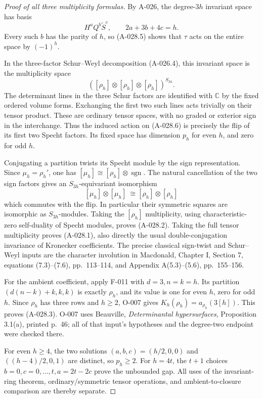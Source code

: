 \begin{proof}[Proof of all three multiplicity formulas]
By A-026, the degree-\(3h\) invariant space has basis
\[
                    H^a Q^b\widetilde S^c,
                    \qquad 2a+3b+4c=h.
\]
Every such \(b\) has the parity of \(h\), so (A-028.5) shows
that \(\tau\) acts on the entire space by \((-1)^h\).

In the three-factor Schur--Weyl decomposition (A-026.4), this
invariant space is the multiplicity space
\[
                  ([\rho_h]\otimes[\rho_h]\otimes[\rho_h])^{S_{3h}}.
                                                               \tag{A-028.6}
\]
The determinant lines in the three Schur factors are identified with
\(\mathbb C\) by the fixed ordered volume forms. Exchanging the
first two such lines acts trivially on their tensor product. These
are ordinary tensor spaces, with no graded or exterior sign in the
interchange. Thus the induced action on (A-028.6) is precisely the
flip of its first two Specht factors. Its fixed space has dimension
\(p_h\) for even \(h\), and zero for odd \(h\).

Conjugating a partition twists its Specht module by the sign
representation. Since \(\mu_h=\rho_h'\), one has
\([\mu_h]\cong[\rho_h]\otimes\operatorname{sgn}\).
The natural cancellation of the two sign factors gives an
\(S_{3h}\)-equivariant isomorphism
\[
 [\mu_h]\otimes[\mu_h]\ \cong
 [\rho_h]\otimes[\rho_h]
\]
which commutes with the flip. In particular their symmetric squares
are isomorphic as \(S_{3h}\)-modules. Taking the \([\rho_h]\)
multiplicity, using characteristic-zero self-duality of Specht modules,
proves (A-028.2). Taking the full tensor multiplicity proves
(A-028.1), also directly the usual double-conjugation invariance
of Kronecker coefficients. The precise classical sign-twist and
Schur--Weyl inputs are the character involution in Macdonald,
Chapter I, Section 7, equations (7.3)--(7.6), pp.~113--114, and
Appendix A(5.3)--(5.6), pp.~155--156.

For the ambient coefficient, apply F-011 with \(d=3,n=k=h\).
Its partition \((d(n-k)+k,k,k)\) is exactly \(\rho_h\),
and its value is one for even \(h\), zero for odd \(h\).
Since \(\rho_h\) has three rows and \(h\geq2\), O-007 gives
\(K_h(\rho_h)=a_{\rho_h}(3[h])\). This proves (A-028.3).
O-007 uses Beauville, \emph{Determinantal hypersurfaces},
Proposition 3.1(a), printed p.~46; all of that input's hypotheses
and the degree-two endpoint were checked there.

For even \(h\geq4\), the two solutions
\((a,b,c)=(h/2,0,0)\) and \(((h-4)/2,0,1)\) are distinct,
so \(p_h\geq2\). For \(h=4t\), the \(t+1\) choices
\(b=0,c=0,\ldots,t,a=2t-2c\) prove the unbounded gap.
All uses of the invariant-ring theorem, ordinary/symmetric tensor
operations, and ambient-to-closure comparison are thereby separate.
\end{proof}

